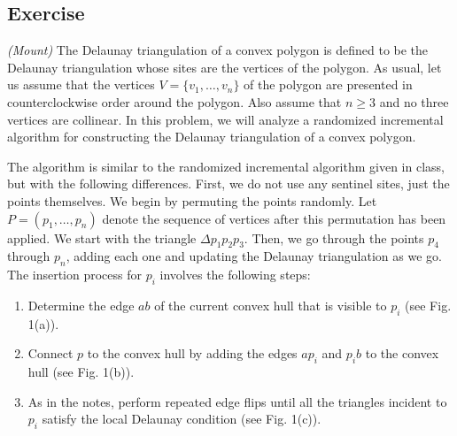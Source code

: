 \documentclass[14pt]{extreport}
\newcounter{counter}
\newcommand{\Exercise}{Exercise \stepcounter{counter}\thecounter}
\begin{document}
\subsection*{\Exercise}
    \textit{(Mount)} The Delaunay triangulation of a convex polygon is defined to be the Delaunay triangulation whose sites are the vertices of the polygon. As usual, let us assume that the vertices \( V = \{v_1, \ldots, v_n\} \) of the polygon are presented in counterclockwise order around the polygon. Also assume that \( n \geq 3 \) and no three vertices are collinear. In this problem, we will analyze a randomized incremental algorithm for constructing the Delaunay triangulation of a convex polygon.

    \vspace{3mm}
    The algorithm is similar to the randomized incremental algorithm given in class, but with the following differences. First, we do not use any sentinel sites, just the points themselves. We begin by permuting the points randomly. Let \( P = (p_1, \ldots, p_n) \) denote the sequence of vertices after this permutation has been applied. We start with the triangle \( \Delta p_1p_2p_3 \). Then, we go through the points \( p_4 \) through \( p_n \), adding each one and updating the Delaunay triangulation as we go. The insertion process for \( p_i \) involves the following steps:
    \begin{enumerate}[label=\roman*.]
        \item Determine the edge \( ab \) of the current convex hull that is visible to \( p_i \) (see Fig. 1(a)).
        \item Connect \( p \) to the convex hull by adding the edges \( ap_i \) and \( p_ib \) to the convex hull (see Fig. 1(b)).
        \item As in the notes, perform repeated edge flips until all the triangles incident to \( p_i \) satisfy the local Delaunay condition (see Fig. 1(c)).
    \end{enumerate}
    
\end{document}
